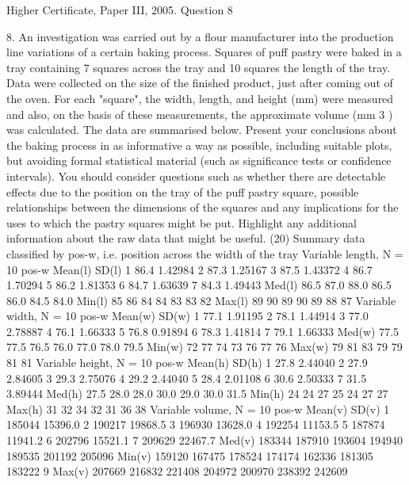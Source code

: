 \documentclass[a4paper,12pt]{article}
\begin{document}
Higher Certificate, Paper III, 2005. Question 8

\begin{framed}
8.
An investigation was carried out by a flour manufacturer into the production line
variations of a certain baking process. Squares of puff pastry were baked in a tray
containing 7 squares across the tray and 10 squares the length of the tray.
Data were collected on the size of the finished product, just after coming out of the
oven. For each "square", the width, length, and height (mm) were measured and also,
on the basis of these measurements, the approximate volume (mm 3 ) was calculated.
The data are summarised below.
Present your conclusions about the baking process in as informative a way as possible,
including suitable plots, but avoiding formal statistical material (such as significance
tests or confidence intervals). You should consider questions such as whether there
are detectable effects due to the position on the tray of the puff pastry square, possible
relationships between the dimensions of the squares and any implications for the uses
to which the pastry squares might be put. Highlight any additional information about
the raw data that might be useful.
(20)
Summary data classified by pos-w, i.e. position across the width of the tray
Variable length, N = 10
pos-w Mean(l)
SD(l)
1
86.4
1.42984
2
87.3
1.25167
3
87.5
1.43372
4
86.7
1.70294
5
86.2
1.81353
6
84.7
1.63639
7
84.3
1.49443 Med(l)
86.5
87.0
88.0
86.5
86.0
84.5
84.0 Min(l)
85
86
84
84
83
83
82 Max(l)
89
90
89
90
89
88
87
Variable width, N = 10
pos-w Mean(w)
SD(w)
1
77.1
1.91195
2
78.1
1.44914
3
77.0
2.78887
4
76.1
1.66333
5
76.8
0.91894
6
78.3
1.41814
7
79.1
1.66333 Med(w)
77.5
77.5
76.5
76.0
77.0
78.0
79.5 Min(w)
72
77
74
73
76
77
76 Max(w)
79
81
83
79
79
81
81
Variable height, N = 10
pos-w Mean(h)
SD(h)
1
27.8
2.44040
2
27.9
2.84605
3
29.3
2.75076
4
29.2
2.44040
5
28.4
2.01108
6
30.6
2.50333
7
31.5
3.89444 Med(h)
27.5
28.0
28.0
30.0
29.0
30.0
31.5 Min(h)
24
24
27
25
24
27
27 Max(h)
31
32
34
32
31
36
38
Variable volume, N = 10
pos-w
Mean(v)
SD(v)
1
185044
15396.0
2
190217
19868.5
3
196930
13628.0
4
192254
11153.5
5
187874
11941.2
6
202796
15521.1
7
209629
22467.7 Med(v)
183344
187910
193604
194940
189535
201192
205096
Min(v)
159120
167475
178524
174174
162336
181305
183222
9
Max(v)
207669
216832
221408
204972
200970
238392
242609
\end{framed}
\newpage
\end{document}
